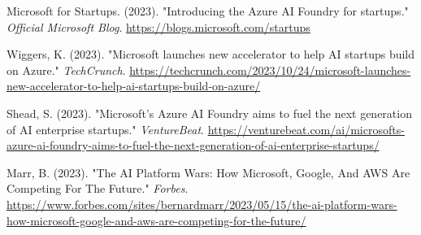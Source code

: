 \documentclass[11pt, a4paper]{article}
\begin{document}
\begin{thebibliography}{9}

Microsoft for Startups. (2023). "Introducing the Azure AI Foundry for startups." \textit{Official Microsoft Blog}. 
\newblock \href{https://blogs.microsoft.com/startups}{https://blogs.microsoft.com/startups}

Wiggers, K. (2023). "Microsoft launches new accelerator to help AI startups build on Azure." \textit{TechCrunch}.
\newblock \href{https://techcrunch.com/2023/10/24/microsoft-launches-new-accelerator-to-help-ai-startups-build-on-azure/}{https://techcrunch.com/2023/10/24/microsoft-launches-new-accelerator-to-help-ai-startups-build-on-azure/}

Shead, S. (2023). "Microsoft’s Azure AI Foundry aims to fuel the next generation of AI enterprise startups." \textit{VentureBeat}.
\newblock \href{https://venturebeat.com/ai/microsofts-azure-ai-foundry-aims-to-fuel-the-next-generation-of-ai-enterprise-startups/}{https://venturebeat.com/ai/microsofts-azure-ai-foundry-aims-to-fuel-the-next-generation-of-ai-enterprise-startups/}

Marr, B. (2023). "The AI Platform Wars: How Microsoft, Google, And AWS Are Competing For The Future." \textit{Forbes}.
\newblock \href{https://www.forbes.com/sites/bernardmarr/2023/05/15/the-ai-platform-wars-how-microsoft-google-and-aws-are-competing-for-the-future/}{https://www.forbes.com/sites/bernardmarr/2023/05/15/the-ai-platform-wars-how-microsoft-google-and-aws-are-competing-for-the-future/}

\end{thebibliography}
\end{document}
